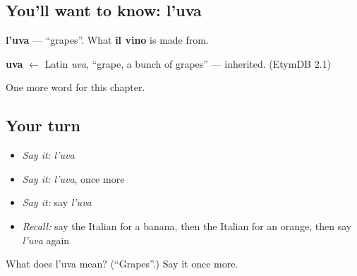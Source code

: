 \subsection*{You'll want to know: l'uva}
\textbf{l'uva} — \textquotedblleft{}grapes\textquotedblright{}. What \textbf{il vino} is made from.

\begin{cousinweb}
\textbf{uva} $\leftarrow$ Latin \emph{uva}, \textquotedblleft{}grape, a bunch of grapes\textquotedblright{} — inherited. (EtymDB 2.1)
\end{cousinweb}

\begin{grammarlens}[title={What you've built}]
One more word for this chapter.
\end{grammarlens}

\subsection*{Your turn}
\begin{itemize}
\raggedright
  \item \emph{Say it:} \emph{l'uva}
  \item \emph{Say it:} \emph{l'uva}, once more
  \item \emph{Say it:} say \emph{l'uva}
  \item \emph{Recall:} say the Italian for a banana, then the Italian for an orange, then say \emph{l'uva} again
\end{itemize}

\begin{tcolorbox}[breakable,colback=teal!4,colframe=teal!35!black,title={Before you move on}]
What does l'uva mean? (\textquotedblleft{}Grapes\textquotedblright{}.) Say it once more.
\end{tcolorbox}
